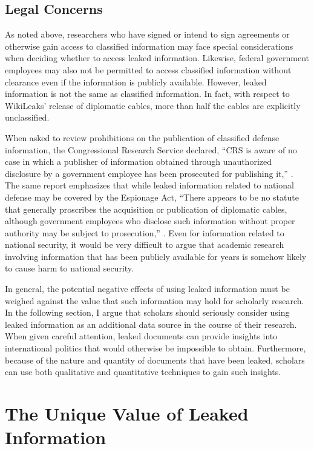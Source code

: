 \documentclass[12pt]{article}
\begin{document}
\subsection*{Legal Concerns}

As noted above, researchers who have signed or intend to sign agreements or otherwise gain access to classified information 
may face special considerations when deciding whether to access leaked information. Likewise, federal government 
employees may also not be permitted to 
access classified information without clearance even if the information is publicly available. However, 
leaked information is not the same as classified information. In fact, with respect to 
WikiLeaks' release of diplomatic cables, more than half the cables are explicitly unclassified.

When asked to review prohibitions on 
the publication of classified defense information, the Congressional Research Service 
declared, ``CRS is aware of no case in which a publisher of information obtained through unauthorized disclosure by a government
employee has been prosecuted for publishing it,'' \citep[16]{elsea2013criminal}.
The same report emphasizes that while leaked information related to national defense may be covered by the Espionage Act, 
``There appears to be no statute that generally proscribes the acquisition or publication of diplomatic cables, although
government employees who disclose such information without proper authority may be subject to prosecution,'' \citep[14]{elsea2013criminal}.
Even for information related to national security, it would be very difficult to argue that academic research involving information 
that has been publicly available for years is somehow likely to cause harm to national security.

In general, the potential negative effects of using leaked information must be weighed against the value that such 
information may hold for scholarly research. In the following section, I argue that scholars should 
seriously 
consider using leaked information as an additional data source in the course of their research. 
When given careful attention, leaked documents can provide insights into international politics that 
would otherwise be impossible to obtain. Furthermore, because of the nature and quantity of documents 
that have been leaked, scholars can use both qualitative and quantitative techniques to gain such 
insights.

\section*{The Unique Value of Leaked Information}
\end{document}
